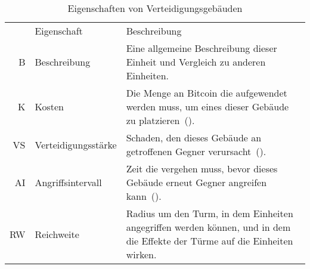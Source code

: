 \begingroup
  \small
  \begin{longtabu}{rlX}
    \rowfont{\normalsize}
    \caption{Eigenschaften von Verteidigungsgebäuden\label{tab:defend-props}}\\

    \midrule[\heavyrulewidth]\rowfont{\itshape}
    & Eigenschaft & Beschreibung \\
    \midrule

    B  & Beschreibung
       & Eine allgemeine Beschreibung dieser Einheit und Vergleich zu anderen
         Einheiten. \\
    K  & Kosten
       & Die Menge an Bitcoin die aufgewendet werden muss, um eines dieser
         Gebäude zu platzieren~(). \\
    VS & Verteidigungsstärke
       & Schaden, den dieses Gebäude an getroffenen Gegner
         verursacht~(). \\
    AI & Angriffsintervall
       & Zeit die vergehen muss, bevor dieses Gebäude erneut Gegner angreifen
         kann~(). \\
    RW & Reichweite
       & Radius um den Turm, in dem Einheiten angegriffen werden können, und in
         dem die Effekte der Türme auf die Einheiten wirken. \\

    \bottomrule
  \end{longtabu}
\endgroup

